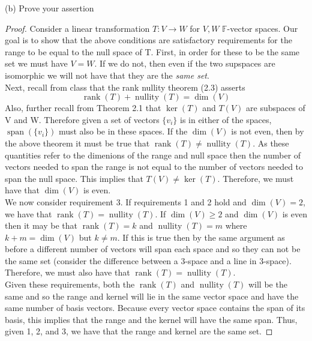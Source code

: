 \documentclass[a4paper, 11pt]{article}
\newcommand{\F}{\mathbb{F}}
\newenvironment{solution}{%
	\begin{list}{}{%
			\setlength{\topsep}{0pt}%
			\setlength{\leftmargin}{1.5cm}%
			\setlength{\rightmargin}{1.5cm}%
			\setlength{\listparindent}{\parindent}%
			\setlength{\itemindent}{\parindent}%
			\setlength{\parsep}{\parskip}%
		}%
		\item[]}{\end{list}}
\begin{document}
\noindent(b) Prove your assertion 
	\begin{solution}
		\begin{proof} 
			\noindent Consider a linear transformation $T:V\to W$ for $V,W$ $\F$-vector spaces. Our goal is to show that the above conditions are satisfactory requirements for the range to be equal to the null space of T. First, in order for these to be the same set we must have $V=W$. If we do not, then even if the two supspaces are isomorphic we will not have that they are the \textit{same set}. \\ 
		
			Next, recall from class that the rank nullity theorem (2.3) asserts 
				\begin{equation*}
					\operatorname{rank}(T) + \operatorname{nullity}(T) = \dim(V) 
				\end{equation*}
			Also, further recall from Theorem 2.1 that $\ker(T)$ and $T(V)$ are subspaces of V and W. Therefore given a set of vectors $\{v_i\}$ is in either of the spaces, $\operatorname{span}(\{v_i\})$ must also be in these spaces. If the $\dim(V)$ is not even, then by the above theorem it must be true that $\operatorname{rank}(T)\neq\operatorname{nullity}(T)$. As these quantities refer to the dimenions of the range and null space then the number of vectors needed to span the range is not equal to the number of vectors needed to span the null space. This implies that $T(V)\neq \ker(T)$. Therefore, we must have that $\dim(V)$ is even. \\ 

			We now consider requirement 3. If requirements 1 and 2 hold and $\dim(V)=2$, we have that $\operatorname{rank}(T)=\operatorname{nullity}(T)$. If $\dim(V)\geq 2$ and $\dim(V)$ is even then it may be that $\operatorname{rank}(T) = k$ and $\operatorname{nullity}(T)= m$ where $k+m = \dim(V)$ but $k\neq m$. If this is true then by the same argument as before a different number of vectors will span  each space and so they can not be the same set (consider the difference between a 3-space and a line in 3-space). Therefore, we must also have that $\operatorname{rank}(T) = \operatorname{nullity}(T)$. \\ 
			
			Given these requirements, both the $\operatorname{rank}(T)$ and $\operatorname{nullity}(T)$ will be the same and so the range and kernel will lie in the same vector space and have the same number of basis vectors. Because every vector space contains the span of its basis, this implies that the range and the kernel will have the same span. Thus, given 1, 2, and 3, we have that the range and kernel are the same set. 
			
		\end{proof} 
	\end{solution} 
\end{document}
